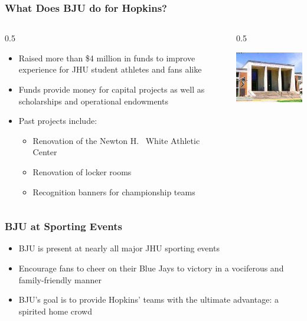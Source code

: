 \documentclass[compress,handout,10pt]{beamer}
\let\olditem\item
\renewcommand{\item}{\setlength{\itemsep}{0.5\baselineskip}\olditem}
\begin{document}
\begin{frame}
	\frametitle{What Does BJU do for Hopkins?}
	\begin {columns}
		\begin {column} {0.5\textwidth}
			\begin {itemize}
				\item Raised more than \$4 million in funds to improve experience for JHU student athletes and fans alike
				\item Funds provide money for capital projects as well as scholarships and operational endowments
				\item Past projects include:
				\begin{itemize}
					\item Renovation of the Newton H.~ White Athletic Center
					\item Renovation of locker rooms
					\item Recognition banners for championship teams
				\end{itemize}
			\end {itemize}
		\end {column}
		\begin{column} {0.5\textwidth}
			\begin{center}
				\includegraphics [width=2in] {AthleticCenter.jpg}
			\end{center}
		\end {column}
	\end {columns}
\end {frame}   

\begin{frame}
    \frametitle{BJU at Sporting Events}
    \begin{itemize}
    	\item BJU is present at nearly all major JHU sporting events
    	\item Encourage fans to cheer on their Blue Jays to victory in a vociferous and family-friendly manner
    	\item BJU's goal is to provide Hopkins' teams with the ultimate advantage: a spirited home crowd
    \end{itemize}
\end{frame}
\end{document}
